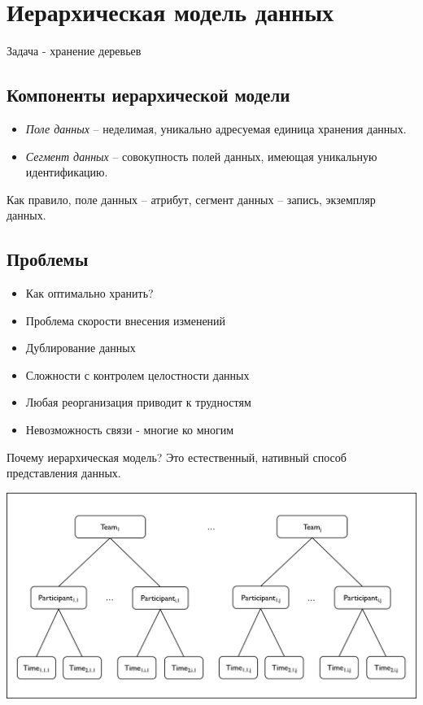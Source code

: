 \documentclass[12pt, a4paper]{article}
\begin{document}
\section{Иерархическая модель данных}

Задача - хранение деревьев

\subsection{Компоненты иерархической модели}

\begin{itemize}
    \item \emph{Поле данных} -- неделимая, уникально адресуемая единица хранения данных.
    \item \emph{Сегмент данных} -- совокупность полей данных, имеющая уникальную идентификацию.
\end{itemize}

Как правило, поле данных -- атрибут, сегмент данных -- запись, экземпляр данных.

\subsection{Проблемы}

\begin{itemize}
    \item Как оптимально хранить?
    \item Проблема скорости внесения изменений
    \item Дублирование данных
    \item Сложности с контролем целостности данных
    \item Любая реорганизация приводит к трудностям
    \item Невозможность связи - многие ко многим
\end{itemize}

Почему иерархическая модель? Это естественный, нативный способ представления данных.

\newline

\includegraphics[scale=0.7]{data/hierarchy.jpeg}
\end{document}
